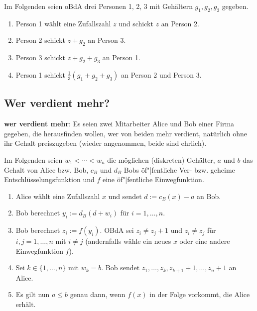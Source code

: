 Im Folgenden seien oBdA drei Personen 1, 2, 3 mit Gehältern $g_1, g_2, g_3$ gegeben.
\begin{enumerate}
    \item
    Person 1 wählt eine Zufallszahl $z$ und schickt $z$ an Person 2.

    \item
    Person 2 schickt $z + g_2$ an Person 3.

    \item
    Person 3 schickt $z + g_2 + g_3$ an Person 1.

    \item
    Person 1 schickt $\frac{1}{3} (g_1 + g_2 + g_3)$ an Person 2 und Person 3.
\end{enumerate}

\subsection{%
    Wer verdient mehr?%
}

\textbf{wer verdient mehr}:
Es seien zwei Mitarbeiter Alice und Bob einer Firma gegeben,
die herausfinden wollen, wer von beiden mehr
verdient, natürlich ohne ihr Gehalt preiszugeben
(wieder angenommen, beide sind ehrlich).

Im Folgenden seien $w_1 < \dotsb < w_n$ die möglichen (diskreten) Gehälter,
$a$ und $b$ das Gehalt von Alice bzw. Bob,
$c_B$ und $d_B$ Bobs öf"|fentliche Ver- bzw. geheime Entschlüsselungsfunktion
und $f$ eine öf"|fentliche Einwegfunktion.
\begin{enumerate}
    \item
    Alice wählt eine Zufallszahl $x$ und sendet $d := c_B(x) - a$ an Bob.

    \item
    Bob berechnet $y_i := d_B(d + w_i)$ für $i = 1, \dotsc, n$.

    \item
    Bob berechnet $z_i := f(y_i)$.
    OBdA sei $z_i \not= z_j + 1$ und $z_i \not= z_j$
    für $i, j = 1, \dotsc, n$ mit $i \not= j$
    (andernfalls wähle ein neues $x$ oder eine andere Einwegfunktion $f$).

    \item
    Sei $k \in \{1, \dotsc, n\}$ mit $w_k = b$.
    Bob sendet $z_1, \dotsc, z_k, z_{k+1} + 1, \dotsc, z_n + 1$ an Alice.

    \item
    Es gilt nun $a \le b$ genau dann, wenn $f(x)$ in der Folge vorkommt, die Alice erhält.
\end{enumerate}

